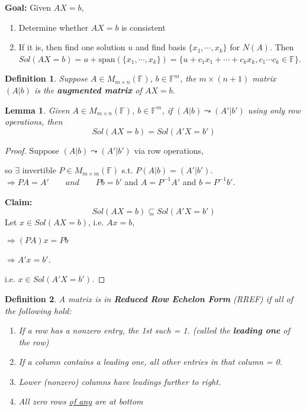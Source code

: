 \documentclass[12pt]{article}
\newtheorem{definition}{Definition}[subsection]
\newtheorem{lemma}{Lemma}[subsection]
\newcommand{\Span}{\mathrm{span}}
\newcommand{\mF}{{\mathbb{F}}}
\begin{document}
\textbf{Goal:} Given $AX = b$, 
\begin{enumerate}
	\item Determine whether $AX = b$ is consistent
	\item If it is, then find one solution $u$ and find basis 
		$\{x_1, \cdots, x_k\}$ for $N(A)$.
		Then $Sol(AX = b) = u + \Span(\{x_1, \cdots, x_k\}) = \{u + c_1x_1 +
		\cdots + c_kx_k, c_1\cdots c_k \in \mF\}$. \\
\end{enumerate}

\begin{definition}
	Suppose $A \in M_{m\times n}(\mF)$, $b \in \mF^m$, the $m\times(n+1)$
	matrix $(A|b)$ is the \textbf{augmented matrix} of $AX = b$. \\
\end{definition}

\begin{lemma}
	Given $A \in M_{m\times n} (\mF)$, $b \in \mF^m$, if $(A|b) \leadsto
	(A'|b')$ using only row operations, then 
	\[
		Sol(AX = b) = Sol(A'X = b')
	\]
\end{lemma}
\begin{proof}
	Suppose $(A|b)\leadsto (A'|b')$ via row operations, 
	
	so $\exists$ invertible $P \in M_{m\times m}(\mF)$ s.t. $P(A|b) = (A'|b')$. 
	$\Rightarrow PA = A' \qquad and \qquad Pb = b'$
	and $A = P^{-1}A'$ and $b = P^{-1}b'$. 

	\textbf{Claim: }
	\[
		Sol(AX = b) \subseteq Sol(A'X = b')
	\]
	Let $x \in Sol(AX = b)$, i.e. $Ax = b$,

	$\Rightarrow (PA)x = Pb$ 

	$\Rightarrow A'x = b'$. 

	i.e. $x \in Sol(A'X = b')$. 
\end{proof}

\begin{definition}
	A matrix is in \textbf{Reduced Row Echelon Form} (RREF) if all of the 
	following hold: 
	\begin{enumerate}
		\item If a row has a nonzero entry, the 1st such = 1. (called 
			the \textbf{leading one} of the row)
		\item If a column contains a leading one, all other entries
			in that column = 0. 
		\item Lower (nonzero) columns have leadings further to right. 
		\item All zero rows \underline{of any} are at bottom
	\end{enumerate}
\end{definition}
\end{document}
